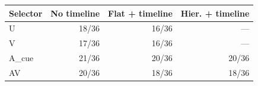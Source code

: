 \begin{tabular}{lrrr}
\toprule Selector & No timeline & Flat + timeline & Hier. + timeline \\
\midrule
U & 18/36 & 16/36 & --- \\
V & 17/36 & 16/36 & --- \\
A\_cue & 21/36 & 20/36 & 20/36 \\
AV & 20/36 & 18/36 & 18/36 \\
\bottomrule
\end{tabular}
